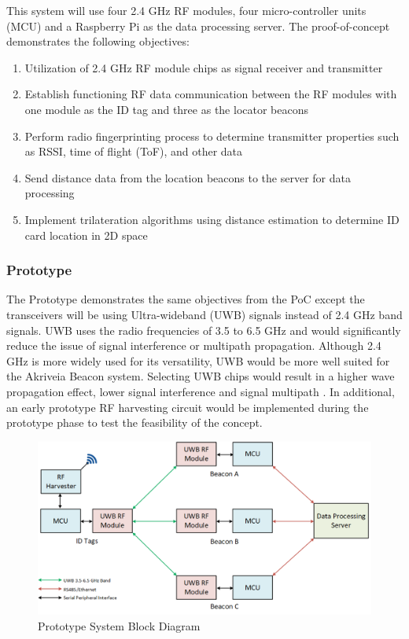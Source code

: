 This system will use four 2.4 GHz \Gls{RF} modules, four micro-controller units (\Gls{MCU}) and a Raspberry Pi as the data processing server. The proof-of-concept demonstrates the following objectives:

\begin{enumerate}
    \item Utilization of 2.4 GHz RF module chips as signal receiver and transmitter
    \item Establish functioning RF data communication between the RF modules with one module as the ID tag and three as the locator beacons
    \item Perform radio fingerprinting process to determine transmitter properties such as RSSI, time of flight (\Gls{ToF}), and other data
    \item Send distance data from the location beacons to the server for data processing
    \item Implement trilateration algorithms using distance estimation to determine ID card location in 2D space
\end{enumerate}

\break
\subsubsection{Prototype}
\bigskip
The Prototype demonstrates the same objectives from the PoC except the transceivers will be using Ultra-wideband (UWB) signals instead of 2.4 GHz band signals. UWB uses the radio frequencies of 3.5 to 6.5 GHz and would significantly reduce the issue of signal interference or multipath propagation. Although 2.4 GHz is more widely used for its versatility, UWB would be more well suited for the Akriveia Beacon system. Selecting UWB chips would result in a higher wave propagation effect, lower signal interference and signal multipath \cite{R4}. In additional, an early prototype RF harvesting circuit would be implemented during the prototype phase to test the feasibility of the concept.

\begin{figure}[h!]
    \centering
    \includegraphics[width=\linewidth]{./images/02_sys_Prototype.png}
    \caption{Prototype System Block Diagram}
    \label{fig:prototype_sys_blk}
\end{figure}
\bigskip

